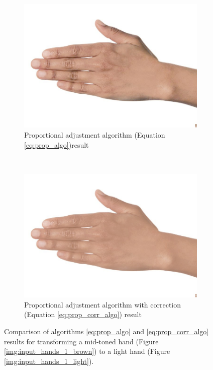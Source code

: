 \begin{figure}[H]
    \centering
    \begin{subfigure}[b]{0.40\textwidth}
        \includegraphics[width=\textwidth]{../rc_test/outputs/20170516_proportional_test/hand_brown_to_hand_light.jpg}
        \caption{Proportional adjustment algorithm (Equation \ref{eq:prop_algo})result}
    \end{subfigure}
    ~
    \begin{subfigure}[b]{0.40\textwidth}
        \includegraphics[width=\textwidth]{../rc_test/outputs/20170517_proportional_corrected_test_alpha3/hand_brown_to_hand_light.jpg}
        \caption{Proportional adjustment algorithm with correction (Equation \ref{eq:prop_corr_algo}) result}
    \end{subfigure}
    \caption{Comparison of algorithms \ref{eq:prop_algo} and \ref{eq:prop_corr_algo} results for transforming a mid-toned hand (Figure \ref{img:input_hands_1_brown}) to a light hand (Figure \ref{img:input_hands_1_light}).\label{img:compare_dark_spot}}
\end{figure}

